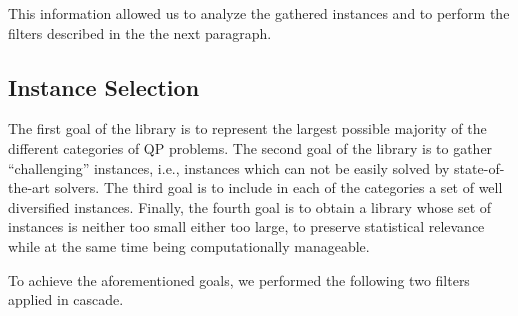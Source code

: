 This information allowed us to analyze the gathered instances and to perform the filters described in the the next paragraph.


\subsection{Instance Selection}\label{subsec:selection}

The first goal of the library is to represent the largest possible majority of
the different categories of QP problems.
The second goal of the library is to gather ``challenging'' instances,
i.e., instances which can not be easily solved by  state-of-the-art
solvers.
The third goal is to include in each of the categories a set of well
diversified instances.
Finally, the fourth goal is to obtain a library whose set of instances
is neither too small either too large, to preserve statistical
relevance while at the same time being computationally manageable.

To achieve the aforementioned goals, we performed the following two
filters applied in cascade.

